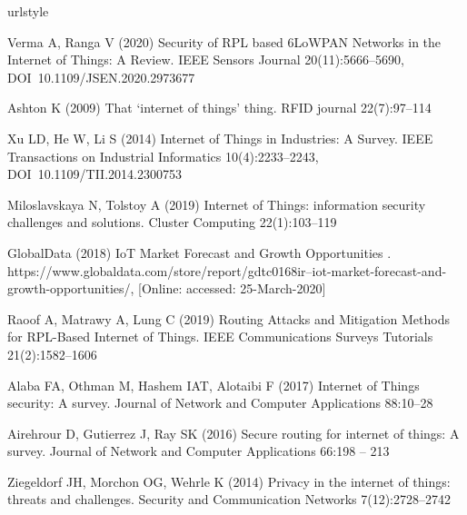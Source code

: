 \documentclass[]{svjour3}                     %
\begin{document}
\begin{thebibliography}{57}
	\providecommand{\natexlab}[1]{#1}
	\providecommand{\url}[1]{{#1}}
	\providecommand{\urlprefix}{URL }
	\expandafter\ifx\csname urlstyle\endcsname\relax
	\providecommand{\doi}[1]{DOI~\discretionary{}{}{}#1}\else
	\providecommand{\doi}{DOI~\discretionary{}{}{}\begingroup
		\urlstyle{rm}\Url}\fi
	\providecommand{\eprint}[2][]{\url{#2}}
	
	{Verma} A, {Ranga} V (2020) {Security of RPL based 6LoWPAN Networks in the
		Internet of Things: A Review}. IEEE Sensors Journal 20(11):5666--5690,
	\doi{10.1109/JSEN.2020.2973677}
	
	Ashton K (2009) That `internet of things' thing. RFID journal 22(7):97--114
	
	Xu LD, He W, Li S (2014) {Internet of Things in Industries: A Survey}. IEEE
	Transactions on Industrial Informatics 10(4):2233--2243,
	\doi{10.1109/TII.2014.2300753}
	
	Miloslavskaya N, Tolstoy A (2019) {Internet of Things: information security
		challenges and solutions}. Cluster Computing 22(1):103--119
	
	GlobalData (2018) {IoT Market Forecast and Growth Opportunities }.
	\url{https://www.globaldata.com/store/report/gdtc0168ir--iot-market-forecast-and-growth-opportunities/},
	[Online: accessed: 25-March-2020]
	
	{Raoof} A, {Matrawy} A, {Lung} C (2019) {Routing Attacks and Mitigation Methods
		for RPL-Based Internet of Things}. IEEE Communications Surveys Tutorials
	21(2):1582--1606
	
	Alaba FA, Othman M, Hashem IAT, Alotaibi F (2017) {Internet of Things security:
		A survey}. Journal of Network and Computer Applications 88:10--28
	
	Airehrour D, Gutierrez J, Ray SK (2016) Secure routing for internet of things:
	A survey. Journal of Network and Computer Applications 66:198 -- 213
	
	Ziegeldorf JH, Morchon OG, Wehrle K (2014) Privacy in the internet of things:
	threats and challenges. Security and Communication Networks 7(12):2728--2742
	

\end{thebibliography}
\end{document}
